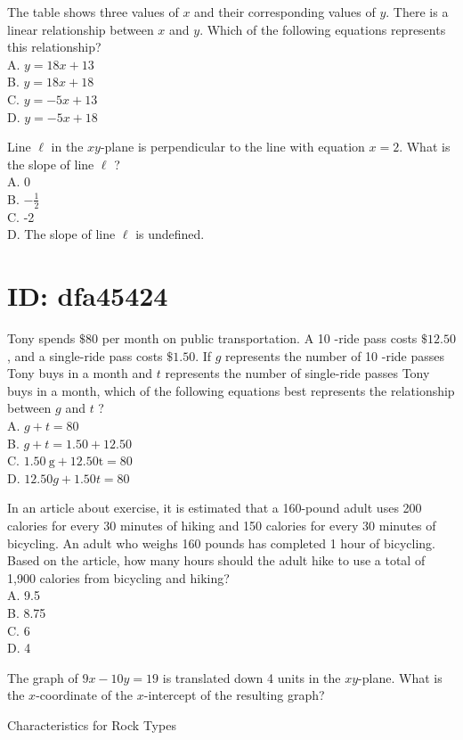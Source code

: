 The table shows three values of $x$ and their corresponding values of $y$. There is a linear relationship between $x$ and $y$. Which of the following equations represents this relationship?\\
A. $y=18 x+13$\\
B. $y=18 x+18$\\
C. $y=-5 x+13$\\
D. $y=-5 x+18$

Line $\ell$ in the $x y$-plane is perpendicular to the line with equation $x=2$. What is the slope of line $\ell$ ?\\
A. 0\\
B. $-\frac{1}{2}$\\
C. -2\\
D. The slope of line $\ell$ is undefined.

\section*{ID: dfa45424}
Tony spends $\$ 80$ per month on public transportation. A 10 -ride pass costs $\$ 12.50$, and a single-ride pass costs $\$ 1.50$. If $g$ represents the number of 10 -ride passes Tony buys in a month and $t$ represents the number of single-ride passes Tony buys in a month, which of the following equations best represents the relationship between $g$ and $t$ ?\\
A. $g+t=80$\\
B. $g+t=1.50+12.50$\\
C. $1.50 \mathrm{~g}+12.50 \mathrm{t}=80$\\
D. $12.50 g+1.50 t=80$

In an article about exercise, it is estimated that a 160-pound adult uses 200 calories for every 30 minutes of hiking and 150 calories for every 30 minutes of bicycling. An adult who weighs 160 pounds has completed 1 hour of bicycling. Based on the article, how many hours should the adult hike to use a total of 1,900 calories from bicycling and hiking?\\
A. 9.5\\
B. 8.75\\
C. 6\\
D. 4

The graph of $9 x-10 y=19$ is translated down 4 units in the $x y$-plane. What is the $x$-coordinate of the $x$-intercept of the resulting graph?

Characteristics for Rock Types

